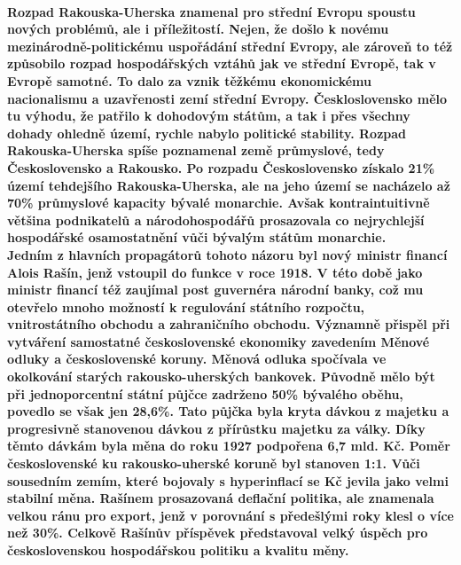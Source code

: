\documentclass{article}
\begin{document}
\paragraph{\quad Rozpad Rakouska-Uherska znamenal pro střední Evropu spoustu nových problémů, ale i příležitostí. Nejen, že došlo k novému mezinárodně-politickému uspořádání střední Evropy, ale zároveň to též způsobilo rozpad hospodářských vztáhů jak ve střední Evropě, tak v Evropě samotné. To dalo za vznik těžkému ekonomickému nacionalismu a uzavřenosti zemí střední Evropy. Českloslovensko mělo tu výhodu, že patřilo k dohodovým státům, a tak i přes všechny dohady ohledně území, rychle nabylo politické stability. Rozpad Rakouska-Uherska spíše poznamenal země průmyslové, tedy Československo a Rakousko. Po rozpadu Československo získalo 21\% území tehdejšího Rakouska-Uherska, ale na jeho území se nacházelo až 70\% průmyslové kapacity bývalé monarchie. Avšak kontraintuitivně většina podnikatelů a národohospodářů prosazovala co nejrychlejší hospodářské osamostatnění vůči bývalým státům monarchie.
\\\indent Jedním z hlavních propagátorů tohoto názoru byl nový ministr financí Alois Rašín, jenž vstoupil do funkce v roce 1918. V této době jako ministr financí též zaujímal post guvernéra národní banky, což mu otevřelo mnoho možností k regulování státního rozpočtu, vnitrostátního obchodu a zahraničního obchodu. Významně přispěl při vytváření samostatné československé ekonomiky zavedením Měnové odluky a československé koruny. Měnová odluka spočívala ve okolkování starých rakousko-uherských bankovek. Původně mělo být při jednoporcentní státní půjčce zadrženo 50\% bývalého oběhu, povedlo se však jen 28,6\%. Tato půjčka byla kryta dávkou z majetku a progresivně stanovenou dávkou z přírůstku majetku za války. Díky těmto dávkám byla měna do roku 1927 podpořena 6,7 mld. Kč. Poměr československé ku rakousko-uherské koruně byl stanoven 1:1. Vůči sousedním zemím, které bojovaly s hyperinflací se Kč jevila jako velmi stabilní měna. Rašínem prosazovaná deflační politika, ale znamenala velkou ránu pro export, jenž v porovnání s předešlými roky klesl o více než 30\%. Celkově Rašínův příspěvek představoval velký úspěch pro československou hospodářskou politiku a kvalitu měny.
}
\end{document}
